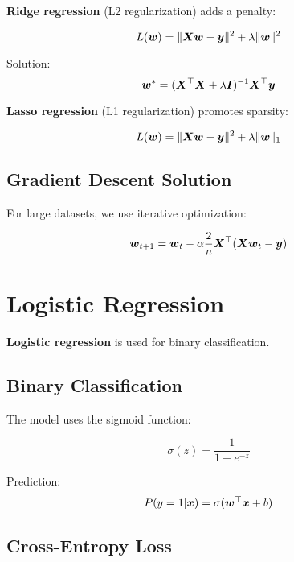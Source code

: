 \textbf{Ridge regression} (L2 regularization) adds a penalty:

\begin{equation}
L(\boldsymbol{w}) = \|\boldsymbol{X}\boldsymbol{w} - \boldsymbol{y}\|^2 + \lambda \|\boldsymbol{w}\|^2
\end{equation}

Solution:
\begin{equation}
\boldsymbol{w}^* = (\boldsymbol{X}^\top \boldsymbol{X} + \lambda \boldsymbol{I})^{-1} \boldsymbol{X}^\top \boldsymbol{y}
\end{equation}

\textbf{Lasso regression} (L1 regularization) promotes sparsity:

\begin{equation}
L(\boldsymbol{w}) = \|\boldsymbol{X}\boldsymbol{w} - \boldsymbol{y}\|^2 + \lambda \|\boldsymbol{w}\|_1
\end{equation}

\subsection{Gradient Descent Solution}

For large datasets, we use iterative optimization:

\begin{equation}
\boldsymbol{w}_{t+1} = \boldsymbol{w}_t - \alpha \frac{2}{n} \boldsymbol{X}^\top (\boldsymbol{X}\boldsymbol{w}_t - \boldsymbol{y})
\end{equation}

\section{Logistic Regression}
\label{sec:logistic-regression}

\textbf{Logistic regression} is used for binary classification.

\subsection{Binary Classification}

The model uses the sigmoid function:

\begin{equation}
\sigma(z) = \frac{1}{1 + e^{-z}}
\end{equation}

Prediction:
\begin{equation}
P(y=1|\boldsymbol{x}) = \sigma(\boldsymbol{w}^\top \boldsymbol{x} + b)
\end{equation}

\subsection{Cross-Entropy Loss}

